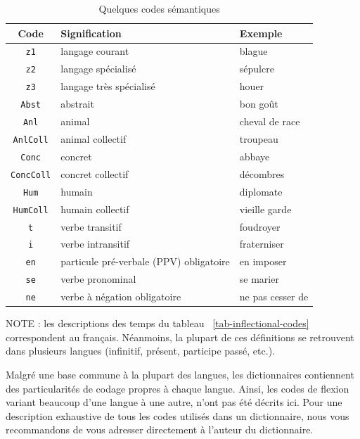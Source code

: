 \begin{table}[!ht]
\begin{center}
\begin{tabular}{|c|l|l|}
\hline
\textbf{Code} & \textbf{Signification} & \textbf{Exemple} \\
\hline
\verb+z1+ & langage courant & blague \\
\hline
\verb+z2+ & langage spécialisé & sépulcre \\
\hline
\verb+z3+ & langage très spécialisé & houer \\
\hline
\verb+Abst+ & abstrait & bon goût \\
\hline
\verb+Anl+ & animal & cheval de race \\
\hline
\verb+AnlColl+ & animal collectif & troupeau \\
\hline
\verb+Conc+ & concret & abbaye \\
\hline
\verb+ConcColl+ & concret collectif & décombres \\
\hline
\verb+Hum+ & humain & diplomate \\
\hline
\verb+HumColl+ & humain collectif & vieille garde \\
\hline
\verb+t+ & verbe transitif & foudroyer \\
\hline
\verb+i+ & verbe intransitif & fraterniser \\
\hline
\verb+en+ & particule pré-verbale (PPV) obligatoire & en imposer \\
\hline
\verb+se+ & verbe pronominal & se marier \\
\hline
\verb+ne+ & verbe à négation obligatoire & ne pas cesser de \\
\hline
\end{tabular}
\caption{Quelques codes sémantiques\label{tab-semantic-codes}}
\end{center}
\end{table}

\noindent NOTE : les descriptions des temps du tableau ~\ref{tab-inflectional-codes} correspondent
au français. Néanmoins, la plupart de ces définitions se retrouvent dans plusieurs langues
(infinitif, présent, participe passé, etc.).


\bigskip
\noindent Malgré une base commune à la plupart des langues, les dictionnaires contiennent des
particularités de codage propres à chaque langue. Ainsi, les codes de flexion variant
beaucoup d’une langue à une autre, n’ont pas été décrits ici. Pour une description exhaustive
de tous les codes utilisés dans un dictionnaire, nous vous recommandons de vous adresser
directement à l’auteur du dictionnaire.


